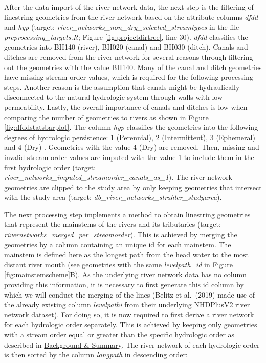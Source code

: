 \documentclass[fleqn,10pt]{wlscirep}
\begin{document}
After the data import of the river network data, the next step is the filtering of linestring geometries from the river network based on the attribute columns \emph{dfdd} and \emph{hyp} (target: \emph{river\_networks\_non\_dry\_selected\_streamtypes} in the file \emph{preprocessing\_targets.R}; Figure \ref{fig:projectdirtree}, line 30). \emph{dfdd} classifies the geometries into BH140 (river), BH020 (canal) and BH030 (ditch). Canals and ditches are removed from the river network for several reasons through filtering out the geometries with the value BH140. Many of the canal and ditch geometries have missing stream order values, which is required for the following processing steps. Another reason is the assumption that canals might be hydraulically disconnected to the natural hydrologic system through walls with low permeability. Lastly, the overall importance of canals and ditches is low when comparing the number of geometries to rivers as shown in Figure \ref{fig:dfddstatsbarplot}. The column \emph{hyp} classifies the geometries into the following degrees of hydrologic persistence: 1 (Perennial), 2 (Intermittent), 3 (Ephemeral) and 4 (Dry) \cite{gallaun_eu-hydro_2019}. Geometries with the value 4 (Dry) are removed. Then, missing and invalid stream order values are imputed with the value 1 to include them in the first hydrologic order (target: \emph{river\_networks\_imputed\_streamorder\_canals\_as\_1}). The river network geometries are clipped to the study area by only keeping geometries that intersect with the study area (target: \emph{db\_river\_networks\_strahler\_studyarea}).

The next processing step implements a method to obtain linestring geometries that represent the mainstems of the rivers and its tributaries (target: \emph{rivernetworks\_merged\_per\_streamorder}). This is achieved by merging the geometries by a column containing an unique id for each mainstem. The mainstem is defined here as the longest path from the head water to the most distant river mouth (see geometries with the same \emph{levelpath\_id} in Figure \ref{fig:mainstemscheme}B). As the underlying river network data has no column providing this information, it is necessary to first generate this id column by which we will conduct the merging of the lines (Belitz et al.~(2019)\cite{belitz_multiorder_2019} made use of the already existing column \emph{levelpathi} from their underlying NHDPlusV2 river network dataset). For doing so, it is now required to first derive a river network for each hydrologic order separately. This is achieved by keeping only geometries with a stream order equal or greater than the specific hydrologic order as described in \protect\hyperlink{background-summary}{Background \& Summary}. The river network of each hydrologic order is then sorted by the column \emph{longpath} in descending order:
\end{document}
